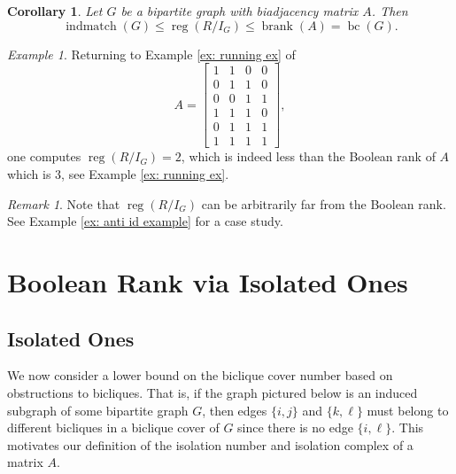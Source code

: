 \documentclass[11pt,letterpaper, reqno]{amsart}
\newtheorem{corollary}[theorem]{Corollary}
\theoremstyle{definition}
\theoremstyle{remark}
\newtheorem{remark}[theorem]{Remark}
\newtheorem{example}[theorem]{Example}
\DeclareMathOperator{\reg}{reg}
\DeclareMathOperator{\bc}{bc}
\DeclareMathOperator{\brank}{brank}
\DeclareMathOperator{\indmatch}{indmatch}
\numberwithin{equation}{section}
\begin{document}
\begin{corollary}
Let $G$ be a bipartite graph with biadjacency matrix $A$. Then 
    \begin{equation}\label{eq: inequalities}
    \indmatch(G) \leq \reg(R/I_G) \leq  \brank(A) = \bc(G).
\end{equation}
\end{corollary}


\begin{example} \label{ex: running example reg}
Returning to Example \ref{ex: running ex} of 
\[
A=\begin{bmatrix}
1&1&0&0\\
0&1&1&0\\
0&0&1&1\\
1&1&1&0\\
0&1&1&1\\
1&1&1&1
\end{bmatrix},
\]
one computes $\reg(R/I_G)=2$, which is indeed less than the Boolean rank of $A$ which is 3, see Example \ref{ex: running ex}.
\end{example}

\begin{remark}
Note that $\reg(R/I_G)$ can be arbitrarily far from the Boolean rank. See Example \ref{ex: anti id example} for a case study.
\end{remark}

\section{Boolean Rank via Isolated Ones}\label{s: isolated ones}
\subsection{Isolated Ones}

We now consider a lower bound on the biclique cover number based on obstructions to bicliques. That is, if the graph pictured below is an induced subgraph of some bipartite graph $G$, then edges $\{i,j\}$ and $\{k,\ell\}$ must belong to different bicliques in a biclique cover of $G$ since there is no edge $\{i,\ell\}$. This motivates our definition of the isolation number and isolation complex of a matrix $A.$\\

\begin{center}
    \end{center}
\end{document}
